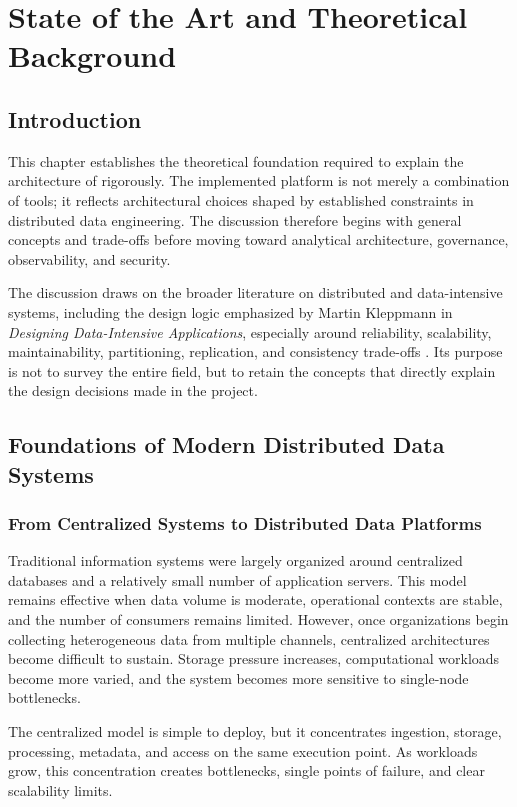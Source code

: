 \chapter{State of the Art and Theoretical Background}

\section{Introduction}
This chapter establishes the theoretical foundation required to explain the architecture of \projectname{} rigorously. The implemented platform is not merely a combination of tools; it reflects architectural choices shaped by established constraints in distributed data engineering. The discussion therefore begins with general concepts and trade-offs before moving toward analytical architecture, governance, observability, and security.

The discussion draws on the broader literature on distributed and data-intensive systems, including the design logic emphasized by Martin Kleppmann in \emph{Designing Data-Intensive Applications}, especially around reliability, scalability, maintainability, partitioning, replication, and consistency trade-offs \cite{kleppmann2017ddia}. Its purpose is not to survey the entire field, but to retain the concepts that directly explain the design decisions made in the project.

\section{Foundations of Modern Distributed Data Systems}

\subsection{From Centralized Systems to Distributed Data Platforms}
Traditional information systems were largely organized around centralized databases and a relatively small number of application servers. This model remains effective when data volume is moderate, operational contexts are stable, and the number of consumers remains limited. However, once organizations begin collecting heterogeneous data from multiple channels, centralized architectures become difficult to sustain. Storage pressure increases, computational workloads become more varied, and the system becomes more sensitive to single-node bottlenecks.

The centralized model is simple to deploy, but it concentrates ingestion, storage, processing, metadata, and access on the same execution point. As workloads grow, this concentration creates bottlenecks, single points of failure, and clear scalability limits.

